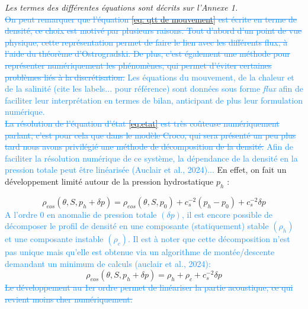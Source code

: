 \documentclass{rapportECC}
\newcommand{\FAadd}[1]{\textcolor{DodgerBlue}{{#1}}}                     %
\newcommand{\FAdel}[1]{\textcolor{DodgerBlue}{\sout{#1}}}                %
\begin{document}
\textit{Les termes des différentes équations  sont décrits sur l'Annexe 1.}
\\
\FAdel{On peut remarquer que l'équation \eqref{eq: qtt de mouvement} est écrite en terme de densité, ce choix est motivé par plusieurs raisons. Tout d'abord d'un point de vue physique, cette représentation permet de faire le lien avec les différents flux, à l'aide du théorème d'Ostrogradski. De plus, c'est également une méthode pour représenter numériquement les phénomènes, qui permet d'éviter certaines problèmes liés à la discrétisation.} \FAadd{Les équations du mouvement, de la chaleur et de la salinité (cite les labels... pour référence) sont données sous forme \textit{flux} afin de faciliter leur interprétation en termes de bilan, anticipant de plus leur formulation numérique.} \\

\vspace{0.5 cm}
\FAdel{La résolution de l'équation d'état \eqref{eq:etat} est très coûteuse numériquement parlant, c'est pour cela que dans le modèle Croco, qui sera présenté un peu plus tard nous avons privilégié une méthode de décomposition de la densité.} \FAadd{Afin de faciliter la résolution numérique de ce système, la dépendance de la densité en la pression totale peut être linéarisée (Auclair et al., 2024)...} En effet, on fait un développement limité autour de la pression hydrostatique $p_h$ :

\begin{equation}
    \rho_{eos}(\theta, S, p_h +\delta p) = \rho_{eos}(\theta, S, p_0) + c_s^{-2}(p_h - p_0) + c_s^{-2}\delta p
\end{equation}
\FAadd{A l'ordre 0 en anomalie de pression totale $(\delta p)$, il est encore possible de décomposer le profil de densité en une composante (statiquement) stable $(\rho_h)$ et une composante instable $(\rho_c)$. Il est à noter que cette décomposition n'est pas unique mais qu'elle est obtenue via un algorithme de montée/descente demandant un minimum de calculs (auclair et al., 2024):}
\begin{equation}
     \rho_{eos}(\theta, S, p_h +\delta p) =  \rho_h + \rho_c + c_s^{-2}\delta p
     \label{eq:decomp densite}
\end{equation}
\FAdel{Le développement au 1er ordre permet de linéariser la partie acoustique, ce qui revient moins cher numériquement.}
\vspace{0.5 cm}
\end{document}
